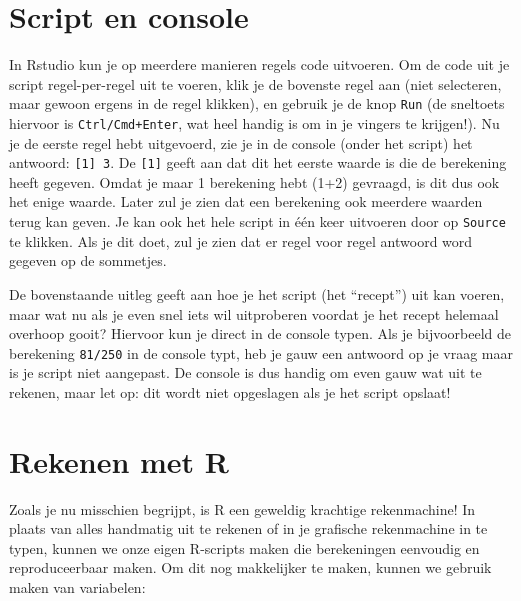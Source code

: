 \documentclass[
  a4paper,
]{scrbook}
\theoremstyle{definition}
\theoremstyle{remark}
\begin{document}
\section{Script en console}\label{script-en-console}

In Rstudio kun je op meerdere manieren regels code uitvoeren. Om de code
uit je script regel-per-regel uit te voeren, klik je de bovenste regel
aan (niet selecteren, maar gewoon ergens in de regel klikken), en
gebruik je de knop \texttt{Run} (de sneltoets hiervoor is
\texttt{Ctrl/Cmd+Enter}, wat heel handig is om in je vingers te
krijgen!). Nu je de eerste regel hebt uitgevoerd, zie je in de console
(onder het script) het antwoord: \texttt{{[}1{]}\ 3}. De
\texttt{{[}1{]}} geeft aan dat dit het eerste waarde is die de
berekening heeft gegeven. Omdat je maar 1 berekening hebt (1+2)
gevraagd, is dit dus ook het enige waarde. Later zul je zien dat een
berekening ook meerdere waarden terug kan geven. Je kan ook het hele
script in één keer uitvoeren door op \texttt{Source} te klikken. Als je
dit doet, zul je zien dat er regel voor regel antwoord word gegeven op
de sommetjes.

De bovenstaande uitleg geeft aan hoe je het script (het ``recept'') uit
kan voeren, maar wat nu als je even snel iets wil uitproberen voordat je
het recept helemaal overhoop gooit? Hiervoor kun je direct in de console
typen. Als je bijvoorbeeld de berekening \texttt{81/250} in de console
typt, heb je gauw een antwoord op je vraag maar is je script niet
aangepast. De console is dus handig om even gauw wat uit te rekenen,
maar let op: dit wordt niet opgeslagen als je het script opslaat!

\section{Rekenen met R}\label{rekenen-met-r}

Zoals je nu misschien begrijpt, is R een geweldig krachtige
rekenmachine! In plaats van alles handmatig uit te rekenen of in je
grafische rekenmachine in te typen, kunnen we onze eigen R-scripts maken
die berekeningen eenvoudig en reproduceerbaar maken. Om dit nog
makkelijker te maken, kunnen we gebruik maken van variabelen:
\end{document}
